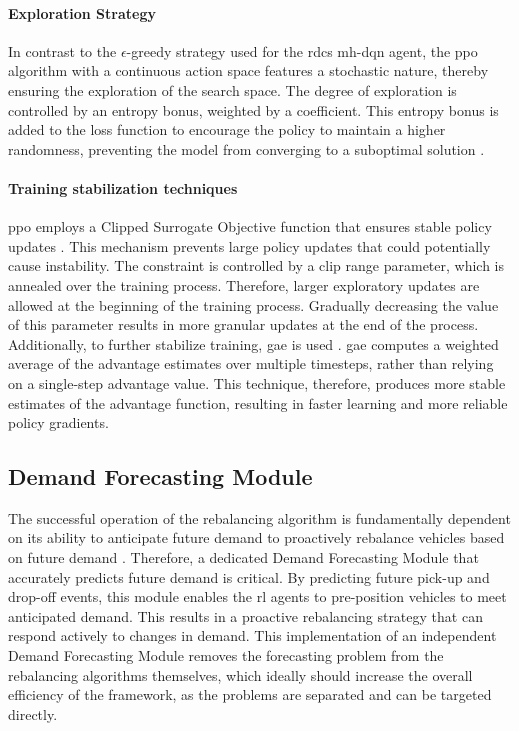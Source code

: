 \paragraph{Exploration Strategy}
In contrast to the $\epsilon$-greedy strategy used for the \glspl{rdc} \gls{mh-dqn} agent, the \gls{ppo} algorithm with a continuous action space features a stochastic nature, thereby ensuring the exploration of the search space.
The degree of exploration is controlled by an entropy bonus, weighted by a coefficient.
This entropy bonus is added to the loss function to encourage the policy to maintain a higher randomness, preventing the model from converging to a suboptimal solution \cite{schulman_proximal_2017}.

\paragraph{Training stabilization techniques}
\gls{ppo} employs a Clipped Surrogate Objective function that ensures stable policy updates \cite{schulman_proximal_2017}.
This mechanism prevents large policy updates that could potentially cause instability.
The constraint is controlled by a clip range parameter, which is annealed over the training process.
Therefore, larger exploratory updates are allowed at the beginning of the training process.
Gradually decreasing the value of this parameter results in more granular updates at the end of the process.
\\

Additionally, to further stabilize training, \gls{gae} is used \cite{schulman_high-dimensional_2018}.
\gls{gae} computes a weighted average of the advantage estimates over multiple timesteps, rather than relying on a single-step advantage value.
This technique, therefore, produces more stable estimates of the advantage function, resulting in faster learning and more reliable policy gradients. 

\subsection{Demand Forecasting Module}\label{sec:design-rl_framework-forecasting_module}
The successful operation of the rebalancing algorithm is fundamentally dependent on its ability to anticipate future demand to proactively rebalance vehicles based on future demand \cite{tolomei_benefits_2021}.
Therefore, a dedicated Demand Forecasting Module that accurately predicts future demand is critical.
By predicting future pick-up and drop-off events, this module enables the \gls{rl} agents to pre-position vehicles to meet anticipated demand.
This results in a proactive rebalancing strategy that can respond actively to changes in demand.
This implementation of an independent Demand Forecasting Module removes the forecasting problem from the rebalancing algorithms themselves, which ideally should increase the overall efficiency of the framework, as the problems are separated and can be targeted directly.


